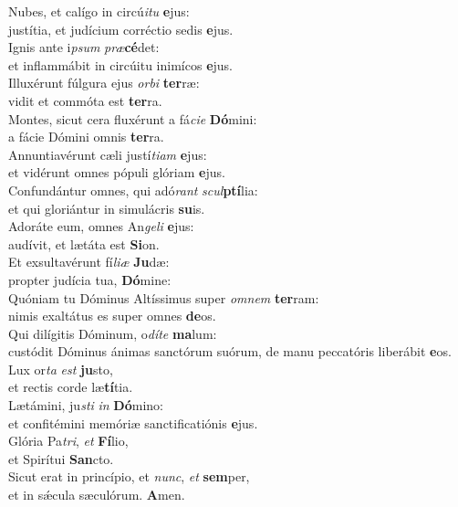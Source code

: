 \evenverse Nubes, et calígo in circú\textit{i}\textit{tu} \textbf{e}jus:~\*\\
\evenverse justítia, et judícium corréctio sedis \textbf{e}jus.\\
\oddverse Ignis ante i\textit{psum} \textit{præ}\textbf{cé}det:~\*\\
\oddverse et inflammábit in circúitu inimícos \textbf{e}jus.\\
\evenverse Illuxérunt fúlgura ejus \textit{or}\textit{bi} \textbf{ter}ræ:~\*\\
\evenverse vidit et commóta est \textbf{ter}ra.\\
\oddverse Montes, sicut cera fluxérunt a fá\textit{ci}\textit{e} \textbf{Dó}mini:~\*\\
\oddverse a fácie Dómini omnis \textbf{ter}ra.\\
\evenverse Annuntiavérunt cæli justí\textit{ti}\textit{am} \textbf{e}jus:~\*\\
\evenverse et vidérunt omnes pópuli glóriam \textbf{e}jus.\\
\oddverse Confundántur omnes, qui adó\textit{rant} \textit{scul}\textbf{ptí}lia:~\*\\
\oddverse et qui gloriántur in simulácris \textbf{su}is.\\
\evenverse Adoráte eum, omnes An\textit{ge}\textit{li} \textbf{e}jus:~\*\\
\evenverse audívit, et lætáta est \textbf{Si}on.\\
\oddverse Et exsultavérunt fí\textit{li}\textit{æ} \textbf{Ju}dæ:~\*\\
\oddverse propter judícia tua, \textbf{Dó}mine:\\
\evenverse Quóniam tu Dóminus Altíssimus super \textit{om}\textit{nem} \textbf{ter}ram:~\*\\
\evenverse nimis exaltátus es super omnes \textbf{de}os.\\
\oddverse Qui dilígitis Dóminum, o\textit{dí}\textit{te} \textbf{ma}lum:~\*\\
\oddverse custódit Dóminus ánimas sanctórum suórum, de manu peccatóris liberábit \textbf{e}os.\\
\evenverse Lux or\textit{ta} \textit{est} \textbf{ju}sto,~\*\\
\evenverse et rectis corde læ\textbf{tí}tia.\\
\oddverse Lætámini, ju\textit{sti} \textit{in} \textbf{Dó}mino:~\*\\
\oddverse et confitémini memóriæ sanctificatiónis \textbf{e}jus.\\
\evenverse Glória Pa\textit{tri}, \textit{et} \textbf{Fí}lio,~\*\\
\evenverse et Spirítui \textbf{San}cto.\\
\oddverse Sicut erat in princípio, et \textit{nunc}, \textit{et} \textbf{sem}per,~\*\\
\oddverse et in sǽcula sæculórum. \textbf{A}men.\\
